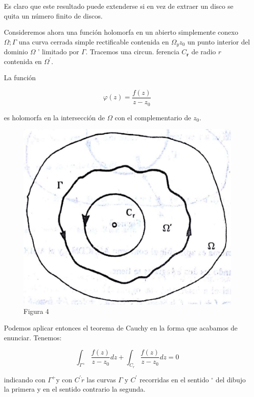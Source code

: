 \documentclass[10pt]{article}
\theoremstyle{plain}
\theoremstyle{definition}
\theoremstyle{remark}
\begin{document}
Es claro que este resultado puede extenderse si en vez de extraer un disco se quita un número finito de discos.


Consideremos ahora una función holomorfa en un abierto simplemente conexo $\Omega ; \Gamma$ una curva cerrada simple rectificable contenida en $\Omega_{y} z_{0}$ un punto interior del dominio $\Omega$ ' limitado por $\Gamma$. Tracemos una circun. ferencia $C_{\boldsymbol{r}}$ de radio $r$ contenida en $\Omega^{\prime}$.

La función

$$
\varphi(z)=\frac{f(z)}{z-z_{0}}
$$

es holomorfa en la intersección de $\Omega$ con el complementario de $z_{0}$.

\begin{figure}[h]
\begin{center}
  \includegraphics[width=\textwidth]{2025_09_05_adecef5eb2053bc129b5g-027}
\captionsetup{labelformat=empty}
\caption{Figura 4}
\end{center}
\end{figure}

Podemos aplicar entonces el teorema de Cauchy en la forma que acabamos de enunciar. Tenemos:

$$
\int_{\Gamma^{+}} \frac{f(z)}{z-z_{0}} d z+\int_{C_{r}} \frac{f(z)}{z-z_{0}} d z=0
$$

indicando con $\Gamma^{+}$y con $C^{\prime} \dot{r}$ las curvas $\Gamma$ y $C^{\prime}$ recorridas en el sentido ${ }^{\circ}$ del dibujo la primera y en el sentido contrario la segunda.
\end{document}
